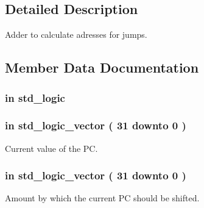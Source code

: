 \subsection{\-Detailed \-Description}
\-Adder to calculate adresses for jumps. 

\subsection{\-Member \-Data \-Documentation}
\hypertarget{classjump__adder_af860a3a86b5cfd289a189d1220f4648d}{
\subsubsection[{clk}]{ {\bfseries in } {\bfseries std\-\_\-logic } }}\label{classjump__adder_af860a3a86b5cfd289a189d1220f4648d}
\hypertarget{classjump__adder_a298266092b29f7f7afb088eecb4e46c1}{
\subsubsection[{instruction}]{ {\bfseries in } {\bfseries std\-\_\-logic\-\_\-vector (   31    downto    0  ) } }}\label{classjump__adder_a298266092b29f7f7afb088eecb4e46c1}


\-Current value of the \-P\-C. 

\hypertarget{classjump__adder_a83702b6a2e8dc32a0ac5cfe7e8cafd61}{
\subsubsection[{jmp\-\_\-offset}]{ {\bfseries in } {\bfseries std\-\_\-logic\-\_\-vector (   31    downto    0  ) } }}\label{classjump__adder_a83702b6a2e8dc32a0ac5cfe7e8cafd61}


\-Amount by which the current \-P\-C should be shifted. 


